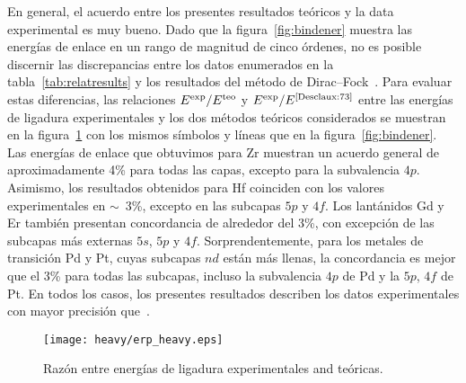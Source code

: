 En general, el acuerdo entre los presentes resultados teóricos y la
data experimental es muy bueno. Dado que la figura~\ref{fig:bindener} 
muestra las energías de enlace en un rango de magnitud de cinco órdenes, 
no es posible discernir las discrepancias entre los datos enumerados 
en la tabla~\ref{tab:relatresults} y los resultados del método de 
Dirac--Fock~\cite{Desclaux:73}. Para evaluar estas diferencias, las 
relaciones $E^{\mbox{\scriptsize exp}}/E^{\mbox{\scriptsize teo}}$ y 
$E^{\mbox{\scriptsize exp}}/E^{\mbox{\scriptsize \cite{Desclaux:73}}}$
entre las energías de ligadura experimentales y los dos métodos 
teóricos considerados se muestran en la figura~\ref{fig:ratios} con los 
mismos símbolos y líneas que en la figura~\ref{fig:bindener}. Las 
energías de enlace que obtuvimos para Zr muestran un acuerdo general de 
aproximadamente 4\% para todas las capas, excepto para la subvalencia 
$4p$. Asimismo, los resultados obtenidos para Hf coinciden con los 
valores experimentales en $\sim$~3\%, excepto en las subcapas $5p$ y 
$4f$. Los lantánidos Gd y Er también presentan concordancia de alrededor 
del 3\%, con excepción de las subcapas más externas $5s$, $5p$ y $4f$. 
Sorprendentemente, para los metales de transición Pd y Pt, cuyas 
subcapas $nd$ están más llenas, la concordancia es mejor que el 3\% 
para todas las subcapas, incluso la subvalencia $4p$ de Pd y la $5p$, 
$4f$ de Pt. En todos los casos, los presentes resultados describen los 
datos experimentales con mayor precisión que~\cite{Desclaux:73}.


\begin{figure}[t]
\centering
 \texttt{[image: heavy/erp\_heavy.eps]} 
\caption{Razón entre energías de ligadura experimentales and teóricas.}
\label{fig:ratios}
\end{figure}


